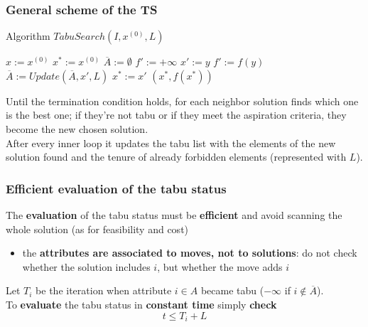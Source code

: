 \newpage

\subsubsection{General scheme of the TS}

\begin{algorithm}
	\caption{Algorithm $TabuSearch(I , x^{(0)}, L)$}
	\begin{algorithmic}
		\STATE $x := x^{(0)}$ 
		\STATE $x^\ast := x^{(0)}$
		\STATE $\overline{A} := \emptyset$
		\STATE $f' := + \infty$
		\STATE $x' := y$
		\STATE $f' := f (y )$
		\ENDIF
		\ENDIF
		\ENDFOR
		\STATE $\overline{A} := Update( \overline{A}, x', L)$
		\STATE $x^\ast := x'$
		\ENDIF
		\ENDWHILE
		\RETURN $(x^\ast, f (x^\ast))$
	\end{algorithmic}
\end{algorithm}

Until the termination condition holds, for each neighbor solution finds which one is the best one; if they're not tabu or if they meet the aspiration criteria, they become the new chosen solution.\\
After every inner loop it updates the tabu list with the elements of the new solution found and the tenure of already forbidden elements (represented with $L$).\\

\newpage

\subsubsection{Efficient evaluation of the tabu status}

The \textbf{evaluation} of the tabu status must be \textbf{efficient} and avoid scanning the whole solution (as for feasibility and cost)
\begin{itemize}
	\item the \textbf{attributes are associated to moves, not to solutions}: do not check whether the solution includes $i$, but whether the move adds $i$
\end{itemize}

Let $T_i$ be the iteration when attribute $i \in A$ became tabu ($-\infty$ if $i \notin \overline{A}$).\\

To \textbf{evaluate} the tabu status in \textbf{constant time} simply \textbf{check}
$$ t \leq T_i + L $$

